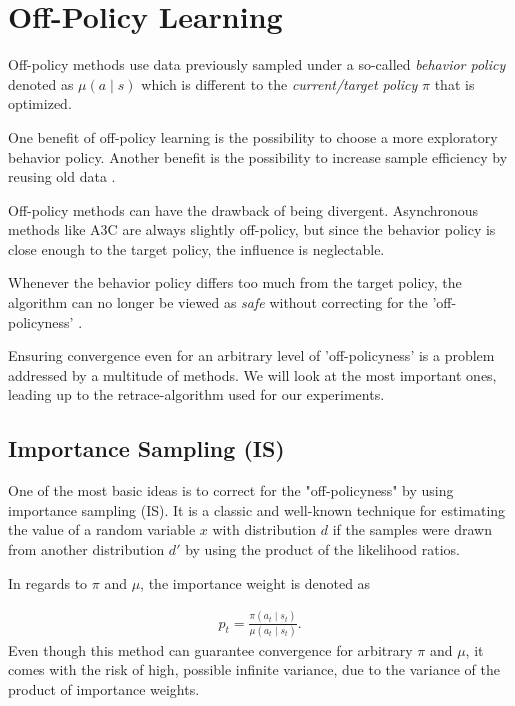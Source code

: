 \pagebreak
\section{Off-Policy Learning}
\raggedbottom 

Off-policy methods use data previously sampled under a so-called \textit{behavior policy} denoted as $\mu(a \mid s)$  which is different to the \textit{current/target policy}  $\pi$ that is optimized.

One benefit of off-policy learning is the possibility to choose a more exploratory behavior policy. 
Another benefit is the possibility to increase sample efficiency by reusing old data
\citep{Degris12}.

Off-policy methods can have the drawback of being divergent.
Asynchronous methods like A3C are always slightly off-policy, but since the behavior policy is close enough to the target policy, the influence is neglectable.

Whenever the behavior policy differs too much from the target policy, the algorithm can no longer be viewed as \textit{safe} without correcting for the 'off-policyness' \citep{Munos16}.

Ensuring convergence even for an arbitrary level of 'off-policyness' is a problem addressed by a multitude of methods.
We will look at the most important ones, leading up to the retrace-algorithm used for our experiments.

\subsection{Importance Sampling (IS)}

One of the most basic ideas is to correct for the "off-policyness" by using importance sampling (IS).
It is a classic and well-known technique for estimating the value of a random variable $x$ with distribution $d$  if the samples were drawn from another distribution $d'$
by using the product of the likelihood ratios.

In regards to $\pi$ and $\mu$, the importance weight is denoted as

\begin{align}
{
p_t = \frac{\pi (a_t \mid s_t)}{\mu (a_t \mid s_t)}.
}
\label{IW}
\end{align}
Even though this method can guarantee convergence \citep{Munos16} for arbitrary $\pi$ and $\mu$, it comes with the risk of high, possible infinite  variance, due to the variance of the product of importance weights.

